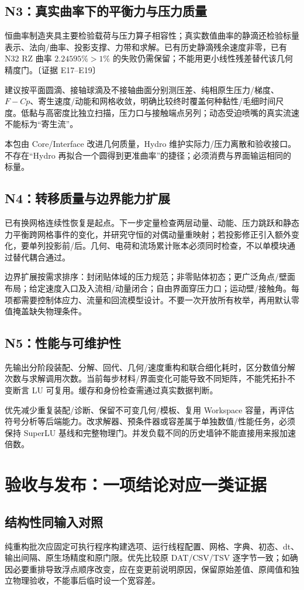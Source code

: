 \documentclass[UTF8,a4paper,11pt,fontset=fandol]{ctexart}
\newcommand{\ev}[1]{{\small\color{muted}〔证据 #1〕}}
\begin{document}
\subsection{N3：真实曲率下的平衡力与压力质量}
恒曲率制造夹具主要检验载荷与压力算子相容性；真实数值曲率的静滴还检验标量表示、法向/曲率、投影支撑、力带和求解。已有历史静滴残余速度非零，已有 N32 RZ 曲率 $2.24595\%>1\%$ 的失败仍需保留；不能用更小线性残差替代该几何精度门。\ev{E17--E19}

建议按平面圆滴、接轴球滴及不接轴曲面分别测压差、纯相原生压力/梯度、$F-Cp$、寄生速度/动能和网格收敛，明确比较终时覆盖何种黏性/毛细时间尺度。低黏与高密度比独立扫描，压力口与接触端点另列；动态受迫喷嘴的真实流速不能标为“寄生流”。

本包由 Core/Interface 改进几何质量，Hydro 维护实际力/压力离散和验收接口。不存在“Hydro 再拟合一个圆得到更准曲率”的捷径；必须消费与界面输运相同的标量。

\subsection{N4：转移质量与边界能力扩展}
已有换网格连续性恢复是起点。下一步定量检查两层动量、动能、压力跳跃和静态力平衡跨网格事件的变化，并研究守恒的对偶动量重映射；若投影修正引入额外变化，要单列投影前/后。几何、电荷和流场累计账本必须同时检查，不以单模块通过替代耦合通过。

边界扩展按需求排序：封闭贴体域的压力规范；非零贴体初态；更广泛角点/壁面布局；给定速度入口及入流相/动量闭合；自由界面穿压力口；运动壁/接触角。每项都需要控制体应力、流量和回流模型设计。不要一次开放所有枚举，再用默认零值掩盖缺失物理条件。

\subsection{N5：性能与可维护性}
先输出分阶段装配、分解、回代、几何/速度重构和联合细化耗时，区分数值分解次数与求解调用次数。当前每步材料/界面变化可能导致不同矩阵，不能凭拓扑不变断言 LU 可复用。缓存和身份检查需通过真实数据判断。

优先减少重复装配/诊断、保留不可变几何/模板、复用 Workspace 容量，再评估符号分析等后端能力。改求解器、预条件器或容差属于单独数值/性能任务，必须保持 SuperLU 基线和完整物理门。并发负载不同的历史墙钟不能直接用来报加速倍数。

\section{验收与发布：一项结论对应一类证据}
\subsection{结构性同输入对照}
纯重构批次应固定可执行程序构建选项、运行线程配置、网格、字典、初态、dt、输出间隔、原生场精度和原门限。优先比较原 DAT/CSV/TSV 逐字节一致；如确因必要重排导致浮点顺序改变，应在变更前说明原因，保留原始差值、原阈值和独立物理验收，不能事后临时设一个宽容差。
\end{document}
